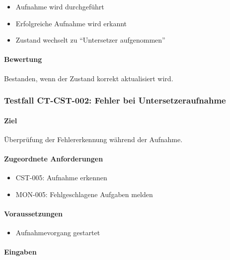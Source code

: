 \documentclass[
  a4paper,
  12pt,
  DIV=12,        %
  parskip=half,  %
  headings=small %
]{scrartcl}
\theoremstyle{definition}
\providecommand{\tightlist}{%
  \setlength{\itemsep}{0pt}\setlength{\parskip}{0pt}}
\theoremstyle{definition}
\begin{document}
\begin{itemize}
\tightlist
\item
  Aufnahme wird durchgeführt
\item
  Erfolgreiche Aufnahme wird erkannt
\item
  Zustand wechselt zu ``Untersetzer aufgenommen''
\end{itemize}

\paragraph{Bewertung}\label{bewertung-5}

Bestanden, wenn der Zustand korrekt aktualisiert wird.

\subsubsection{Testfall CT-CST-002: Fehler bei
Untersetzeraufnahme}\label{testfall-ct-cst-002-fehler-bei-untersetzeraufnahme}

\paragraph{Ziel}\label{ziel-6}

Überprüfung der Fehlererkennung während der Aufnahme.

\paragraph{Zugeordnete Anforderungen}\label{zugeordnete-anforderungen-6}

\begin{itemize}
\tightlist
\item
  CST-005: Aufnahme erkennen
\item
  MON-005: Fehlgeschlagene Aufgaben melden
\end{itemize}

\paragraph{Voraussetzungen}\label{voraussetzungen-6}

\begin{itemize}
\tightlist
\item
  Aufnahmevorgang gestartet
\end{itemize}

\paragraph{Eingaben}\label{eingaben-6}
\end{document}
